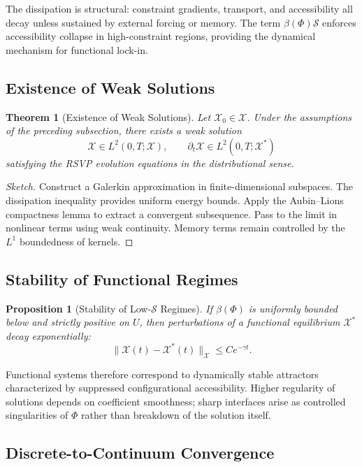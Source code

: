 \documentclass[11pt, a4paper, twocolumn]{article}
\newtheorem{proposition}[definition]{Proposition}
\newtheorem{theorem}[definition]{Theorem}
\newcommand{\X}{\mathcal{X}}
\newcommand{\Sfield}{\mathcal{S}}
\begin{document}
The dissipation is structural: constraint gradients, transport, and
accessibility all decay unless sustained by external forcing or memory. The
term $\beta(\Phi)\Sfield$ enforces accessibility collapse in high-constraint
regions, providing the dynamical mechanism for functional lock-in.

\subsection{Existence of Weak Solutions}

\begin{theorem}[Existence of Weak Solutions]
Let $\X_0 \in \mathcal{X}$. Under the assumptions of the preceding subsection,
there exists a weak solution
\[
    \X \in L^2(0,T;\mathcal{X}), \qquad \partial_t \X \in L^2(0,T;\mathcal{X}^*)
\]
satisfying the RSVP evolution equations in the distributional sense.
\end{theorem}

\begin{proof}[Sketch]
Construct a Galerkin approximation in finite-dimensional subspaces. The
dissipation inequality provides uniform energy bounds. Apply the Aubin--Lions
compactness lemma to extract a convergent subsequence. Pass to the limit in
nonlinear terms using weak continuity. Memory terms remain controlled by the
$L^1$ boundedness of kernels.
\end{proof}

\subsection{Stability of Functional Regimes}

\begin{proposition}[Stability of Low-$\Sfield$ Regimes]
If $\beta(\Phi)$ is uniformly bounded below and strictly positive on $U$, then
perturbations of a functional equilibrium $\X^*$ decay exponentially:
\[
    \|\X(t) - \X^*(t)\|_\mathcal{X} \leq C e^{-\gamma t}.
\]
\end{proposition}

Functional systems therefore correspond to dynamically stable attractors
characterized by suppressed configurational accessibility. Higher regularity
of solutions depends on coefficient smoothness; sharp interfaces arise as
controlled singularities of $\Phi$ rather than breakdown of the solution itself.

\subsection{Discrete-to-Continuum Convergence}
\end{document}

